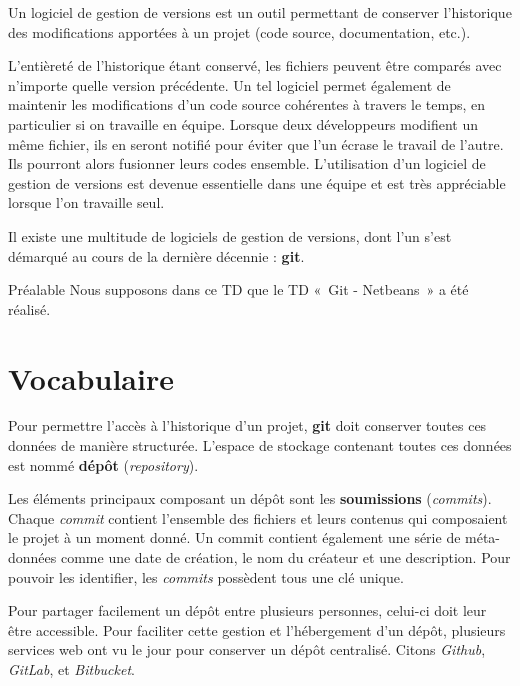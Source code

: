 \documentclass[a4paper,11pt]{style-esi/td}
\newcommand{\git}{\textbf{git }}
\begin{document}
\entete
\titre
{}
\lastedit

\bigskip

Un logiciel de gestion de versions est un outil permettant de conserver
l’historique des modifications apportées à un projet (code source,
documentation, etc.).

L’entièreté de l’historique étant conservé, les fichiers peuvent être comparés
avec n’importe quelle version précédente.  Un tel logiciel permet également de
maintenir les modifications d’un code source cohérentes à travers le temps, en
particulier si on travaille en équipe. Lorsque deux développeurs modifient un
même fichier, ils en seront notifié pour éviter que l’un écrase le travail de
l’autre. Ils pourront alors fusionner leurs codes ensemble.  L’utilisation d’un
logiciel de gestion de versions est devenue essentielle dans une équipe et est
très appréciable lorsque l’on travaille seul. 

Il existe une multitude de logiciels de gestion de versions, dont l’un s’est
démarqué au cours de la dernière décennie : \textbf{git}.  


\begin{alertit}{Préalable}
	Nous supposons dans ce TD que le TD «~Git - Netbeans~» a été réalisé. 
\end{alertit}

\tableofcontents
\newpage


\section{Vocabulaire}

Pour permettre l’accès à l’historique d’un projet, \git doit conserver toutes
ces données de manière structurée. L’espace de stockage contenant toutes ces
données est nommé \textbf{dépôt} (\textit{repository}). 

Les éléments principaux composant un dépôt sont les \textbf{soumissions}
(\textit{commits}).  Chaque \textit{commit} contient l’ensemble des fichiers et
leurs contenus qui composaient le projet à un moment donné. Un commit contient
également une série de méta-données comme une date de création, le nom du
créateur et une description. Pour pouvoir les identifier, les \textit{commits}
possèdent tous une clé unique. 

Pour partager facilement un dépôt entre plusieurs personnes, celui-ci doit leur 
être accessible. Pour faciliter cette gestion et l'hébergement d’un dépôt, 
plusieurs services web ont vu le jour pour conserver un dépôt centralisé. 
Citons \textit{Github}, \textit{GitLab}, et \textit{Bitbucket}. 
\end{document}
